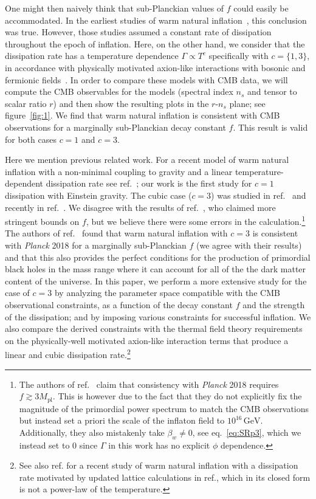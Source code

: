 \documentclass[a4paper,11pt]{article}
\begin{document}
One might then naively think that sub-Planckian values of $f$ could easily be accommodated. In the earliest studies of warm natural inflation~\cite{Visinelli:2011jy}, this conclusion was true. However, those studies assumed a constant rate of dissipation throughout the epoch of inflation. Here, on the other hand, we consider that the dissipation rate has a temperature dependence $\Gamma \propto T^c$ specifically with $c=\{1,3\}$, in accordance with physically motivated axion-like interactions with bosonic and fermionic fields~\cite{Visinelli:2014qla, Visinelli:2016rhn, Berghaus:2019whh, Berghaus:2020ekh, DeRocco:2021rzv}. In order to compare these models with CMB data, we will compute the CMB observables for the models (spectral index $n_s$ and tensor to scalar ratio $r$) and then show the resulting plots in the $r$-$n_s$ plane; see figure~\ref{fig:1}. We find that warm natural inflation is consistent with CMB observations for a marginally sub-Planckian decay constant $f$. This result is valid for both cases $c=1$ and $c=3$.

Here we mention previous related work.
For a recent model of warm natural inflation with a non-minimal coupling to gravity and a linear temperature-dependent dissipation rate see ref.~\cite{AlHallak:2022haa}; our work is the first study for $c=1$ dissipation with Einstein gravity. The cubic case ($c=3$) was studied in ref.~\cite{Reyimuaji:2020bkm} and recently in ref.~\cite{Correa:2022ngq}. We disagree with the results of ref.~\cite{Reyimuaji:2020bkm}, who claimed more stringent bounds on $f$, but we believe there were some errors in the calculation.\footnote{The authors of ref.~\cite{Reyimuaji:2020bkm} claim that consistency with \textit{Planck} 2018 requires $f\gtrsim 3 M_{\mathrm{pl}}$. This is however due to the fact that they do not explicitly fix the magnitude of the primordial power spectrum to match the CMB observations but instead set a priori the scale of the inflaton field to $10^{16}\,\mathrm{GeV}$.
Additionally, they also mistakenly take $\beta_w\neq 0$, see eq.~\eqref{eq:SRp3}, which we instead set to $0$ since $\Gamma$ in this work has no explicit $\phi$ dependence.} The authors of ref.~\cite{Correa:2022ngq} found that warm natural inflation with $c=3$ is consistent with \textit{Planck} 2018 for a marginally sub-Planckian $f$ (we agree with their results) and that this also provides the perfect conditions for the production of primordial black holes in the mass range where it can account for all of the the dark matter content of the universe. In this paper, we perform a more extensive study for the case of $c=3$ by analyzing the parameter space compatible with the CMB observational constraints, as a function of the decay constant $f$ and the strength of the dissipation; and by imposing various constraints for successful inflation. We also compare the derived constraints with the thermal field theory requirements on the physically-well motivated axion-like interaction terms that produce a linear and cubic dissipation rate.\footnote{See also ref.\cite{Klose:2022rxh} for a recent study of warm natural inflation with a dissipation rate motivated by updated lattice calculations in ref.\cite{Laine:2022ytc}, which in its closed form is not a power-law of the temperature.}
\end{document}
